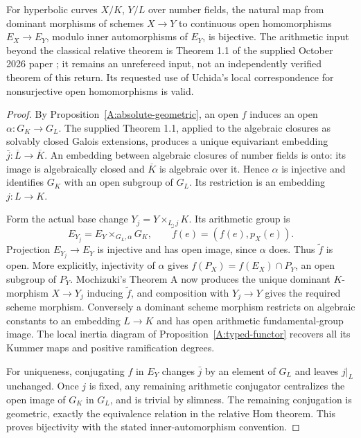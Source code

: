 \begin{proposition}
\label{A:absolute-hom}
For hyperbolic curves $X/K$, $Y/L$ over number fields, the
natural map from dominant morphisms of schemes $X\to Y$ to
continuous open homomorphisms $E_X\to E_Y$, modulo inner
automorphisms of $E_Y$, is bijective. The arithmetic input
beyond the classical relative theorem is Theorem 1.1 of the
supplied October 2026 paper \cite{A_OpenAI2026Hom}; it remains
an unrefereed input, not an independently verified theorem
of this return. Its requested use of Uchida's local
correspondence for nonsurjective open homomorphisms is valid.
\end{proposition}
\begin{proof}
By Proposition~\ref{A:absolute-geometric}, an open $f$ induces
an open $\alpha:G_K\to G_L$. The supplied Theorem 1.1,
applied to the algebraic closures as solvably closed Galois
extensions, produces a unique equivariant embedding
$\bar j:\overline L\to\overline K$. An embedding between
algebraic closures of number fields is onto: its image is
algebraically closed and $\overline K$ is algebraic over it.
Hence $\alpha$ is injective and identifies $G_K$ with an
open subgroup of $G_L$. Its restriction is an embedding
$j:L\to K$.

Form the actual base change $Y_j=Y\times_{L,j}K$. Its
arithmetic group is
\[
 E_{Y_j}=E_Y\times_{G_L,\alpha}G_K,
 \qquad
 \widetilde f(e)=(f(e),p_X(e)).
\]
Projection $E_{Y_j}\to E_Y$ is injective and has open image,
since $\alpha$ does. Thus $\widetilde f$ is open. More
explicitly, injectivity of $\alpha$ gives
$f(P_X)=f(E_X)\cap P_Y$, an open subgroup of $P_Y$.
Mochizuki's Theorem A \cite{A_Mochizuki1999} now produces the
unique dominant $K$-morphism $X\to Y_j$ inducing
$\widetilde f$, and composition with $Y_j\to Y$ gives the
required scheme morphism. Conversely a dominant scheme
morphism restricts on algebraic constants to an embedding
$L\to K$ and has open arithmetic fundamental-group image.
The local inertia diagram of Proposition~\ref{A:typed-functor}
recovers all its Kummer maps and positive ramification degrees.

For uniqueness, conjugating $f$ in $E_Y$ changes $\bar j$
by an element of $G_L$ and leaves $j|_L$ unchanged. Once $j$
is fixed, any remaining arithmetic conjugator centralizes the
open image of $G_K$ in $G_L$, and is trivial by slimness.
The remaining conjugation is geometric, exactly the equivalence
relation in the relative Hom theorem. This proves bijectivity
with the stated inner-automorphism convention.


\end{proof}
